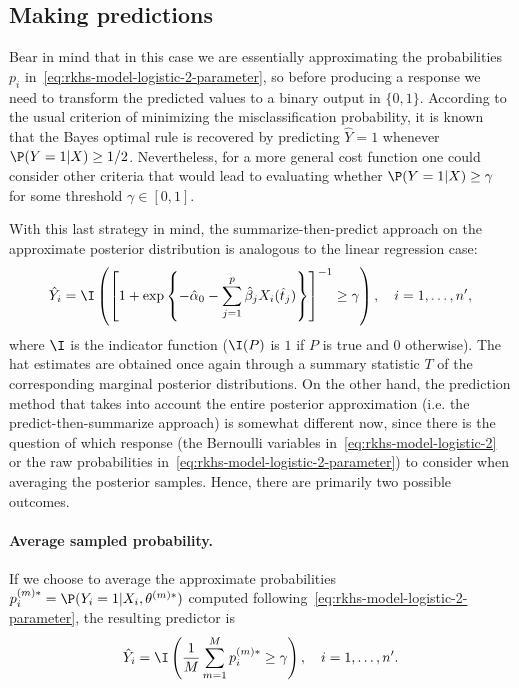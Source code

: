 \subsection*{Making predictions}

Bear in mind that in this case we are essentially approximating the probabilities \(p_i\) in~\eqref{eq:rkhs-model-logistic-2-parameter}, so before producing a response we need to transform the predicted values to a binary output in \(\{0, 1\}\). According to the usual criterion of minimizing the misclassification probability, it is known that the Bayes optimal rule is recovered by predicting \(\hat Y=1\) whenever \(\P(Y=1|X) \geq 1/2\). Nevertheless, for a more general cost function one could consider other criteria that would lead to evaluating whether \(\P(Y=1|X) \geq \gamma\) for some threshold \(\gamma\in[0, 1]\).

With this last strategy in mind, the summarize-then-predict approach on the approximate posterior distribution is analogous to the linear regression case:
\begin{equation}\label{eq:summarize-predict-logistic}
\hat Y_i = \I \left( \left[\displaystyle 1 + \exp\left\{-\hat\alpha_0 - \sum_{j=1}^p \hat\beta_j X_i(\hat t_j)\right\}\right]^{-1} \geq \gamma \right), \quad i=1,\dots,n',
\end{equation}
where \(\I\) is the indicator function (\(\I(P)\) is \(1\) if \(P\) is true and \(0\) otherwise). The hat estimates are obtained once again through a summary statistic \(T\) of the corresponding marginal posterior distributions. On the other hand, the prediction method that takes into account the entire posterior approximation (i.e. the predict-then-summarize approach) is somewhat different now, since there is the question of which response (the Bernoulli variables in~\eqref{eq:rkhs-model-logistic-2} or the raw probabilities in~\eqref{eq:rkhs-model-logistic-2-parameter}) to consider when averaging the posterior samples. Hence, there are primarily two possible outcomes.

  \paragraph{Average sampled probability.} If we choose to average the approximate probabilities \(p_i^{(m)*} = \P(Y_i =1 | X_i,\theta^{(m)*})\) computed following~\eqref{eq:rkhs-model-logistic-2-parameter}, the resulting predictor is
  \[
    \hat Y_i = \I\left(\frac{1}{M} \sum_{m=1}^M p_i^{(m)*} \geq \gamma\right), \quad i=1,\dots,n'.
  \]
